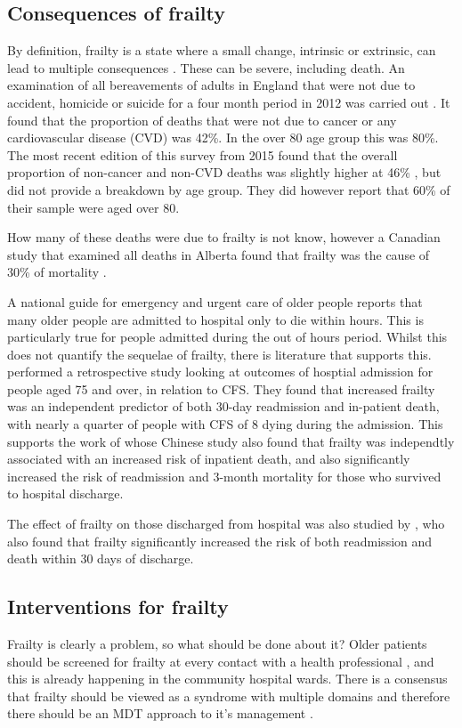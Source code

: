\documentclass
[
	12pt,
	a4paper,
	oneside,
]{article}
\begin{document}
\subsection{Consequences of frailty}

By definition, frailty is a state where a small change, intrinsic or extrinsic, can
lead to multiple consequences \parencite{collard:12}. These can be severe, including 
death. An examination
of all bereavements of adults in England that were not due to accident, homicide or suicide for 
a four month period in 2012 was 
carried out \parencite{ons:13}. It found that the proportion of deaths
that were not due to cancer or any cardiovascular disease (CVD) was 42\%. In the over 80
age group this was 80\%. The most recent edition of this survey from 2015 found
that the overall proportion of non-cancer and non-CVD deaths was slightly higher 
at 46\% \parencite{ons:16}, but did not provide a breakdown by age group. They 
did however report that 60\% of their sample were aged over 80.

How many of these deaths were due to frailty is not know, however 
a Canadian study that examined all deaths in Alberta found that frailty was the
cause of 30\% of mortality \parencite{fassbender:09}.

A national guide for emergency and urgent care of older people \parencite{silver:12}
reports that many older people are admitted to hospital only to die within hours.
This is particularly true for people admitted during the out of hours period.
Whilst this does not quantify the sequelae of frailty, there is literature that 
supports this. \textcite{wallis:15} performed a retrospective study looking 
at outcomes of hosptial admission for people aged 75 and over, in relation to CFS. 
They found that increased frailty was an independent predictor of both 30-day
readmission and in-patient death, with nearly a quarter of people with CFS of 8 dying 
during the admission. This supports the work of \textcite{kang:15} whose Chinese 
study also found that frailty was independtly associated with an increased risk of 
inpatient death, and also significantly increased the risk of readmission and 
3-month mortality for those who survived to hospital discharge.

The effect of frailty on those discharged from hospital was also studied by 
\parencite{kahlon:15}, who also found that frailty significantly increased the 
risk of both readmission and death within 30 days of discharge.

\subsection{Interventions for frailty}
Frailty is clearly a problem, so what should be done about it? Older patients 
should be screened for frailty at every contact with a health professional 
\parencite{bgs:14}, and 
this is already happening in the community hospital wards. There is a consensus that 
frailty should be viewed as a syndrome with multiple domains and therefore
there should be an MDT approach to it's management \parencite{vellas:16}.
\end{document}
